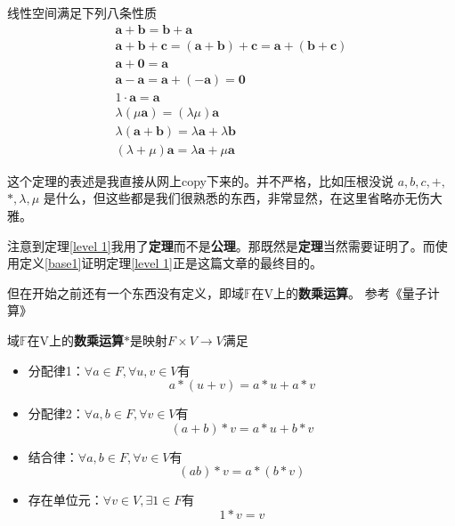 \documentclass[12pt,hyperref,a4paper,UTF8]{ctexart}
\begin{document}
\begin{Theorem} \label{level 1}
    线性空间满足下列八条性质
\begin{gather}
    \boldsymbol{a}+\boldsymbol{b}=\boldsymbol{b}+\boldsymbol{a}
\\
\boldsymbol{a}+\boldsymbol{b}+\boldsymbol{c}=\left( \boldsymbol{a}+\boldsymbol{b} \right) +\boldsymbol{c}=\boldsymbol{a}+\left( \boldsymbol{b}+\boldsymbol{c} \right) 
\\
\boldsymbol{a}+\mathbf{0}=\boldsymbol{a}
\\
\boldsymbol{a}-\boldsymbol{a}=\boldsymbol{a}+\left( -\boldsymbol{a} \right) =\mathbf{0}
\\
1\cdot \boldsymbol{a}=\boldsymbol{a}
\\
\lambda \left( \mu \boldsymbol{a} \right) =\left( \lambda \mu \right) \boldsymbol{a}
\\
\lambda \left( \boldsymbol{a}+\boldsymbol{b} \right) =\lambda \boldsymbol{a}+\lambda \boldsymbol{b}
\\
\left( \lambda +\mu \right) \boldsymbol{a}=\lambda \boldsymbol{a}+\mu \boldsymbol{a}
\end{gather}

这个定理的表述是我直接从网上copy下来的。并不严格，比如压根没说
$a,b,c,+,$
$*,\lambda,\mu$ 是什么，但这些都是我们很熟悉的东西，非常显然，在这里省略亦无伤大雅。
\end{Theorem}

注意到定理\ref{level 1}我用了\textbf{定理}而不是\textbf{公理}。那既然是\textbf{定理}当然需要证明了。而使用定义\ref{base1}证明定理\ref{level 1}正是这篇文章的最终目的。

但在开始之前还有一个东西没有定义，即域$\mathbb{F}$在V上的\textbf{数乘运算}。
参考《量子计算》

\begin{Definition}\label{base3}
    域$\mathbb{F}$在V上的\textbf{数乘运算}$*$是映射$F\times V\rightarrow V$满足

    \begin{itemize}
        \item 分配律1：$\forall a\in F,\forall u,v \in V$有
        $$a*(u+v)=a*u+a*v$$
        \item 分配律2：$\forall a,b\in F,\forall v \in V$有
        $$(a+b)*v=a*u+b*v$$
        \item 结合律：$\forall a,b\in F,\forall v \in V$有
        $$(ab)*v=a*(b*v)$$
        \item 存在单位元：$\forall v \in V,\exists 1 \in F$有 
        $$1*v=v$$
    \end{itemize}
\end{Definition}
\end{document}
